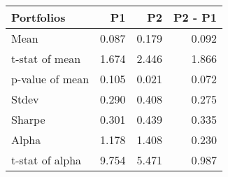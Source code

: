 \begin{tabular}{lrrr}
\toprule
Portfolios & P1 & P2 & P2 - P1 \\
\midrule
Mean & 0.087 & 0.179 & 0.092 \\
t-stat of mean & 1.674 & 2.446 & 1.866 \\
p-value of mean & 0.105 & 0.021 & 0.072 \\
Stdev & 0.290 & 0.408 & 0.275 \\
Sharpe & 0.301 & 0.439 & 0.335 \\
Alpha & 1.178 & 1.408 & 0.230 \\
t-stat of alpha & 9.754 & 5.471 & 0.987 \\
\bottomrule
\end{tabular}

